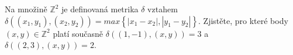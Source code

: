Na množině $\mathbb{Z}^{2}$ je definovaná metrika $\delta$ vztahem $\delta
((x_{1},y_{1}), (x_{2},y_{2})) = max \left \{ \left | x_{1}-x_{2} \right |,\left
| y_{1}-y_{2} \right | \right \}$. Zjistěte, pro které body $(x,y) \in
\mathbb{Z}^{2}$ platí současně $\delta ((1,-1), (x,y))= 3$ a
$\delta((2,3),(x,y))=2$.
